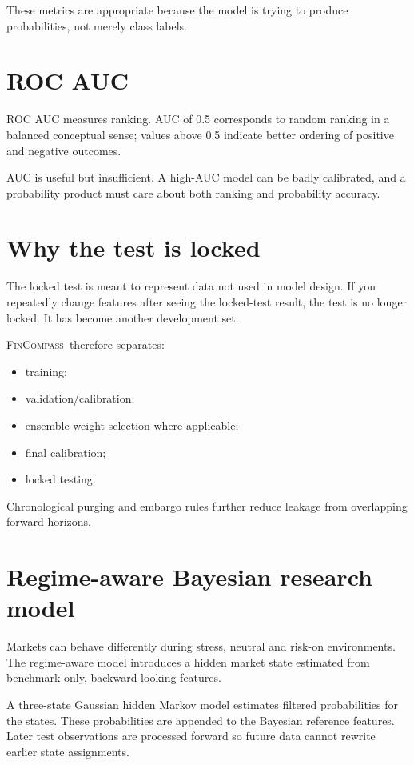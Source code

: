 \documentclass[11pt]{article}
\newcommand{\FC}{\textsc{FinCompass}}
\begin{document}
These metrics are appropriate because the model is trying to produce probabilities, not merely class labels.

\section{ROC AUC}
ROC AUC measures ranking. AUC of 0.5 corresponds to random ranking in a balanced conceptual sense; values above 0.5 indicate better ordering of positive and negative outcomes.

AUC is useful but insufficient. A high-AUC model can be badly calibrated, and a probability product must care about both ranking and probability accuracy.

\section{Why the test is locked}
The locked test is meant to represent data not used in model design. If you repeatedly change features after seeing the locked-test result, the test is no longer locked. It has become another development set.

\FC\ therefore separates:
\begin{itemize}[itemsep=0.15em]
\item training;
\item validation/calibration;
\item ensemble-weight selection where applicable;
\item final calibration;
\item locked testing.
\end{itemize}

Chronological purging and embargo rules further reduce leakage from overlapping forward horizons.

\section{Regime-aware Bayesian research model}
Markets can behave differently during stress, neutral and risk-on environments. The regime-aware model introduces a hidden market state estimated from benchmark-only, backward-looking features.

A three-state Gaussian hidden Markov model estimates filtered probabilities for the states. These probabilities are appended to the Bayesian reference features. Later test observations are processed forward so future data cannot rewrite earlier state assignments.
\end{document}
